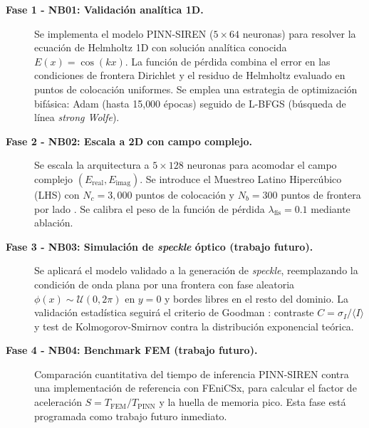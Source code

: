 \begin{description}
    \item[\textbf{Fase 1 - NB01: Validación analítica 1D.}]
    Se implementa el modelo PINN-SIREN ($5 \times 64$ neuronas) para resolver la
    ecuación de Helmholtz 1D con solución analítica conocida $E(x) = \cos(kx)$.
    La función de pérdida combina el error en las condiciones de frontera
    Dirichlet y el residuo de Helmholtz evaluado en puntos de colocación uniformes.
    Se emplea una estrategia de optimización bifásica: Adam (hasta 15{,}000 épocas)
    seguido de L-BFGS (búsqueda de línea \textit{strong Wolfe}).

    \item[\textbf{Fase 2 - NB02: Escala a 2D con campo complejo.}]
    Se escala la arquitectura a $5 \times 128$ neuronas para acomodar el campo
    complejo $(E_\text{real}, E_\text{imag})$. Se introduce el Muestreo Latino
    Hipercúbico (LHS) con $N_c = 3{,}000$ puntos de colocación y $N_b = 300$
    puntos de frontera por lado \parencite{mckay1979lhs}. Se calibra el peso de
    la función de pérdida $\lambda_\text{fís} = 0.1$ mediante ablación.

    \item[\textbf{Fase 3 - NB03: Simulación de \textit{speckle} óptico (trabajo futuro).}]
    Se aplicará el modelo validado a la generación de \textit{speckle}, reemplazando
    la condición de onda plana por una frontera con fase aleatoria
    $\phi(x) \sim \mathcal{U}(0, 2\pi)$ en $y = 0$ y bordes libres en el
    resto del dominio. La validación estadística seguirá el criterio de Goodman
    \parencite{goodman2007speckle}: contraste $C = \sigma_I / \langle I \rangle$
    y test de Kolmogorov-Smirnov contra la distribución exponencial teórica.

    \item[\textbf{Fase 4 - NB04: Benchmark FEM (trabajo futuro).}]
    Comparación cuantitativa del tiempo de inferencia PINN-SIREN contra una
    implementación de referencia con FEniCSx, para calcular el factor de
    aceleración $S = T_\text{FEM} / T_\text{PINN}$ y la huella de memoria pico.
    Esta fase está programada como trabajo futuro inmediato.
\end{description}

